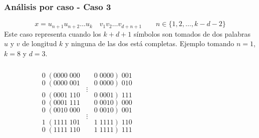 \documentclass[10pt,mathserif]{beamer}%
\begin{document}
\begin{frame}
  \frametitle{Análisis por caso - Caso 3}
  $$x = u_{n+1} u_{n+2} \dots u_k \quad  v_1 v_2 \dots v_{d+n+1}   \qquad n \in \{1,2,\dots ,k - d - 2\}  $$
  Este caso representa cuando los $k + d + 1$ símbolos son tomados de dos palabras $u$ y $v$ de longitud $k$ y ninguna de las dos está completas.
  Ejemplo tomando \textbf{$n = 1$}, $k = 8$ y $d = 3$.
  \begin{columns}
    \begin{column}{0.5\textwidth}
      \begin{small}

      $$0\; (0000\; 000 \qquad 0 \;0000 ) \;001$$
      $$0\; (0000 \;001 \qquad 0 \;0000 ) \;010$$
      $$\vdots$$
      $$0\; (0001 \;110 \qquad 0 \;0001 ) \;111$$
      $$0\; (0001 \;111 \qquad 0 \;0010 ) \;000$$
      $$0\; (0010 \;000 \qquad 0 \;0010 ) \;001$$
      $$\vdots$$
      $$1\; (1111 \;101 \qquad 1 \;1111 ) \;110$$
      $$0\; (1111 \;110 \qquad 1 \;1111 ) \;111$$
      \end{small}
    \end{column}
    \begin{column}{0.5\textwidth}  %
          
    \end{column}
    \end{columns}
\end{frame}
\end{document}

